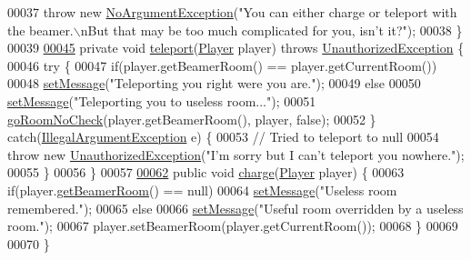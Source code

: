 \begin{DoxyCode}
00037             \textcolor{keywordflow}{throw} \textcolor{keyword}{new} \hyperlink{classNoArgumentException}{NoArgumentException}(\textcolor{stringliteral}{"You can either charge or teleport with the
       beamer.\(\backslash\)nBut that may be too much complicated for you, isn't it?"});
00038     \}
00039 
\hypertarget{BeamerCommand_8java_source_l00045}{}\hyperlink{classBeamerCommand_a1f19366fb8b873959f72f38d49d5b178}{00045}     \textcolor{keyword}{private} \textcolor{keywordtype}{void} \hyperlink{classBeamerCommand_a1f19366fb8b873959f72f38d49d5b178}{teleport}(\hyperlink{classPlayer}{Player} player) \textcolor{keywordflow}{throws} 
      \hyperlink{classUnauthorizedException}{UnauthorizedException} \{
00046         \textcolor{keywordflow}{try} \{
00047             \textcolor{keywordflow}{if}(player.getBeamerRoom() == player.getCurrentRoom())
00048                 \hyperlink{classCommand_a715709d8f0ab65879d79ad1725c96f17}{setMessage}(\textcolor{stringliteral}{"Teleporting you right were you are."});
00049             \textcolor{keywordflow}{else}
00050                 \hyperlink{classCommand_a715709d8f0ab65879d79ad1725c96f17}{setMessage}(\textcolor{stringliteral}{"Teleporting you to useless room..."});
00051             \hyperlink{classGoCommand_a3149bf695c19b78c39cfc4dadece7846}{goRoomNoCheck}(player.getBeamerRoom(), player, \textcolor{keyword}{false});
00052         \} \textcolor{keywordflow}{catch}(\hyperlink{classIllegalArgumentException}{IllegalArgumentException} e) \{
00053             \textcolor{comment}{// Tried to teleport to null}
00054             \textcolor{keywordflow}{throw} \textcolor{keyword}{new} \hyperlink{classUnauthorizedException}{UnauthorizedException}(\textcolor{stringliteral}{"I'm sorry but I can't teleport you
       nowhere."});
00055         \}
00056     \}
00057 
\hypertarget{BeamerCommand_8java_source_l00062}{}\hyperlink{classBeamerCommand_a130a572b2ec0532c92ea5033a098b1ac}{00062}     \textcolor{keyword}{public} \textcolor{keywordtype}{void} \hyperlink{classBeamerCommand_a130a572b2ec0532c92ea5033a098b1ac}{charge}(\hyperlink{classPlayer}{Player} player) \{
00063         \textcolor{keywordflow}{if}(player.\hyperlink{classPlayer_a9114998742351bf793e093cb198993ca}{getBeamerRoom}() == null)
00064             \hyperlink{classCommand_a715709d8f0ab65879d79ad1725c96f17}{setMessage}(\textcolor{stringliteral}{"Useless room remembered."});
00065         \textcolor{keywordflow}{else}
00066             \hyperlink{classCommand_a715709d8f0ab65879d79ad1725c96f17}{setMessage}(\textcolor{stringliteral}{"Useful room overridden by a useless room."});
00067         player.setBeamerRoom(player.getCurrentRoom());
00068     \}
00069 
00070 \}
\end{DoxyCode}
